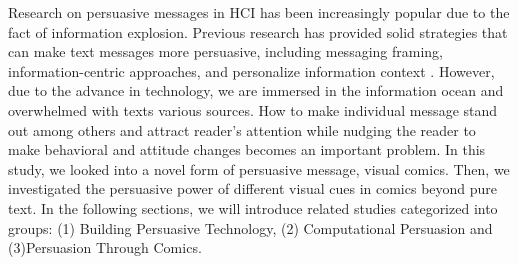 Research on persuasive messages in HCI has been increasingly popular due to the fact of information explosion. Previous research has provided solid strategies that can make text messages more persuasive, including messaging framing, information-centric approaches, and personalize information context \cite{maheswaran1990influence,goldstein2008room,BaumerKFAGPRNOG12,dey2017art,LeeKF11,brown2006reflecting,grimes2007designing}. However, due to the advance in technology, we are immersed in the information ocean and overwhelmed with texts various sources. How to make individual message stand out among others and attract reader's attention while nudging the reader to make behavioral and attitude changes becomes an important problem. In this study, we looked into a novel form of persuasive message, visual comics. Then, we investigated the persuasive power of different visual cues in comics beyond pure text. In the following sections, we will introduce related studies categorized into groups: (1) Building Persuasive Technology, (2) Computational Persuasion and (3)Persuasion Through Comics.\par

